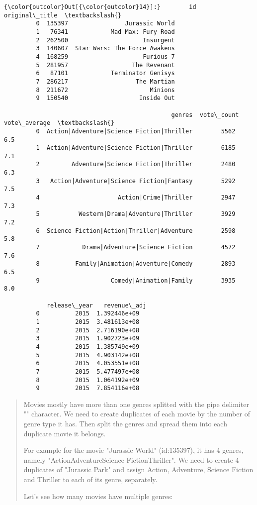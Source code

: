 \documentclass[11pt]{article}
\begin{document}
\begin{Verbatim}[commandchars=\\\{\}]
{\color{outcolor}Out[{\color{outcolor}14}]:}        id                original\_title  \textbackslash{}
         0  135397                Jurassic World   
         1   76341            Mad Max: Fury Road   
         2  262500                     Insurgent   
         3  140607  Star Wars: The Force Awakens   
         4  168259                     Furious 7   
         5  281957                  The Revenant   
         6   87101            Terminator Genisys   
         7  286217                   The Martian   
         8  211672                       Minions   
         9  150540                    Inside Out   
         
                                               genres  vote\_count  vote\_average  \textbackslash{}
         0  Action|Adventure|Science Fiction|Thriller        5562           6.5   
         1  Action|Adventure|Science Fiction|Thriller        6185           7.1   
         2         Adventure|Science Fiction|Thriller        2480           6.3   
         3   Action|Adventure|Science Fiction|Fantasy        5292           7.5   
         4                      Action|Crime|Thriller        2947           7.3   
         5           Western|Drama|Adventure|Thriller        3929           7.2   
         6  Science Fiction|Action|Thriller|Adventure        2598           5.8   
         7            Drama|Adventure|Science Fiction        4572           7.6   
         8          Family|Animation|Adventure|Comedy        2893           6.5   
         9                    Comedy|Animation|Family        3935           8.0   
         
            release\_year   revenue\_adj  
         0          2015  1.392446e+09  
         1          2015  3.481613e+08  
         2          2015  2.716190e+08  
         3          2015  1.902723e+09  
         4          2015  1.385749e+09  
         5          2015  4.903142e+08  
         6          2015  4.053551e+08  
         7          2015  5.477497e+08  
         8          2015  1.064192e+09  
         9          2015  7.854116e+08  
\end{Verbatim}
            
    \begin{quote}
Movies mostly have more than one genres splitted with the pipe delimiter
"\textbar{}" character. We need to create duplicates of each movie by
the number of genre type it has. Then split the genres and spread them
into each duplicate movie it belongs.

For example for the movie "Jurassic World" (id:135397), it has 4 genres,
namely "Action\textbar{}Adventure\textbar{}Science
Fiction\textbar{}Thriller". We need to create 4 duplicates of "Jurassic
Park" and assign Action, Adventure, Science Fiction and Thriller to each
of its genre, separately.

Let's see how many movies have multiple genres:
\end{quote}
\end{document}
